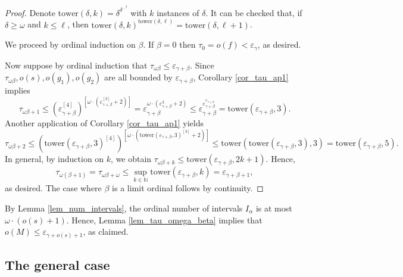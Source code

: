 \documentclass{article}
\theoremstyle{definition}
\newcommand{\N}{\mathbb N}
\begin{document}
\begin{proof}
Denote $\mathrm{tower}(\delta,k)=\delta^{\delta^{\cdots^\delta}}$ with $k$ instances of $\delta$. It can be checked that, if $\delta\ge \omega$ and $k\le \ell$, then $\mathrm{tower}(\delta,k)^{\mathrm{tower}(\delta,\ell)}=\mathrm{tower}(\delta,\ell+1)$.

    We proceed by ordinal induction on $\beta$. If $\beta=0$ then $\tau_0=o(f)<\varepsilon_\gamma$, as desired.

    Now suppose by ordinal induction that $\tau_{\omega\beta}\le\varepsilon_{\gamma+\beta}$. Since $\tau_{\omega\beta},o(s),o(g_1),o(g_2)$ are all bounded by $\varepsilon_{\gamma+\beta}$, Corollary \ref{cor_tau_ap1} implies
    \begin{equation*}
\tau_{\omega\beta+1}\le(\varepsilon_{\gamma+\beta}^{[4]})^{[\omega\cdot(\varepsilon_{\gamma+\beta}^{[3]}+2)]} = \varepsilon_{\gamma+\beta}^{\omega\cdot(\varepsilon_{\gamma+\beta}^{3}+2)}\le\varepsilon_{\gamma+\beta}^{\varepsilon_{\gamma+\beta}^{\varepsilon_{\gamma+\beta}}}=\mathrm{tower}(\varepsilon_{\gamma+\beta},3).
    \end{equation*}
    Another application of Corollary \ref{cor_tau_ap1} yields
    \begin{equation*}
        \tau_{\omega\beta+2}\le(\mathrm{tower}(\varepsilon_{\gamma+\beta},3)^{[4]})^{[\omega\cdot(\mathrm{tower}(\varepsilon_{\gamma+\beta},3)^{[3]}+2)]}\le\mathrm{tower}(\mathrm{tower}(\varepsilon_{\gamma+\beta},3),3)=\mathrm{tower}(\varepsilon_{\gamma+\beta},5).
    \end{equation*}
    In general, by induction on $k$, we obtain $\tau_{\omega\beta+k}\le\mathrm{tower}(\varepsilon_{\gamma+\beta},2k+1)$. Hence,
    \begin{equation*}
        \tau_{\omega(\beta+1)}=
    \tau_{\omega\beta+\omega}\le\sup_{k\in\N}\mathrm{tower}(\varepsilon_{\gamma+\beta},k)=\varepsilon_{\gamma+\beta+1},
    \end{equation*}
    as desired. The case where $\beta$ is a limit ordinal follows by continuity.
\end{proof}

By Lemma \ref{lem_num_intervals}, the ordinal number of intervals $I_\alpha$ is at most $\omega\cdot(o(s)+1)$. Hence, Lemma \ref{lem_tau_omega_beta} implies that $o(M) \le \varepsilon_{\gamma + o(s)+1}$, as claimed.

\subsection{The general case}
\end{document}
